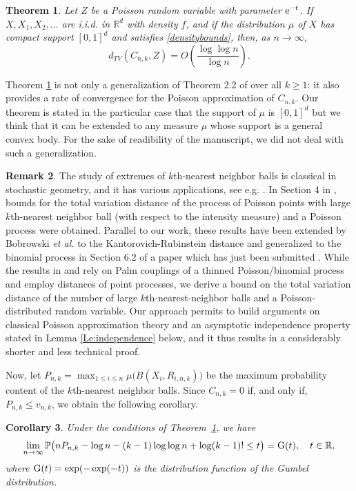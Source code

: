 \documentclass{article}
\theoremstyle{thm}
\newtheorem{theorem}{Theorem}[section]
\newtheorem{corollary}[theorem]{Corollary}
\theoremstyle{definition}
\newtheorem{remark}[theorem]{Remark}
\theoremstyle{definition}
\theoremstyle{def}
\newcommand{\RR}{\mathbb{R}} %
\begin{document}
\begin{theorem}\label{Th:poissonapprox}
Let $Z$ be a Poisson random variable with parameter ${\rm e}^{-t}$. If $X, X_1,X_2, \ldots $ are i.i.d. in $\RR^d$ with density $f$, and if the distribution $\mu$ of $X$ has compact support {$[0,1]^d$}
 and satisfies \eqref{densitybounds}, then, as $n \to \infty$,
 \[
 d_{TV}\left(C_{n,k}, Z\right) =  O\left( \frac{\log\log n}{\log n} \right).
 \]
\end{theorem}
 Theorem \ref{Th:poissonapprox} is not only a generalization of Theorem 2.2 of \cite{GHW19} over all $k\geq 1$: it also provides a rate of convergence for the Poisson approximation of  $C_{n,k}$. {Our theorem is stated in the particular case {that} the support of $\mu$ is $[0,1]^d$ but we think that it can be extended to any measure $\mu$ whose support is a general convex body. For {the sake of} readibility of the manuscript, we did not deal with such a generalization.  }
 
 {\begin{remark}
The study of extremes of $k$th-nearest neighbor balls is classical in stochastic geometry, and it has various applications, see e.g. \cite{P}. In Section 4 in \cite{O}, bounds for the total variation distance of the process of Poisson points with large $k$th-nearest neighbor ball (with respect to the intensity measure) and a Poisson process were obtained. Parallel to our work, these results have been extended by  Bobrowski \textit{et al.} to the Kantorovich-Rubinstein distance and generalized to the binomial process in Section 6.2 of a paper  which has just been submitted \cite{BSY}. While the results in \cite{BSY}  and \cite{O} rely on Palm couplings of a thinned Poisson/binomial process and employ distances of point processes, we derive a bound on the total variation distance of the number of large $k$th-nearest-neighbor balls and a Poisson-distributed random variable. Our approach permits to build arguments  on classical Poisson approximation theory \cite{AGG} and  an asymptotic independence property stated in Lemma \ref{Le:independence} below, and it thus results in a considerably shorter and less technical proof.
\end{remark}} 

Now, let
 $P_{n,k} = \max_{1 \le i \le n} \mu\big(B(X_i,R_{i,n,k})\big)$ be the maximum probability content of the $k$th-nearest neighbor balls.
Since $C_{n,k} = 0$ if, and only if, $P_{n,k} \le v_{n,k}$, we obtain the following corollary.

\begin{corollary}
Under the conditions of Theorem~\ref{Th:poissonapprox}, we have
\[
\lim_{n\to \infty} \mathbb{P}\big(n P_{n,k} - \log n - (k-1)\log \log n + \log(k-1)! \le t\big) = {\rm G}(t), \quad t \in \mathbb{R},
\]
where ${\rm G}(t) = \exp(-\exp(-t))$ is the distribution function of the Gumbel distribution.
\end{corollary}
\end{document}
